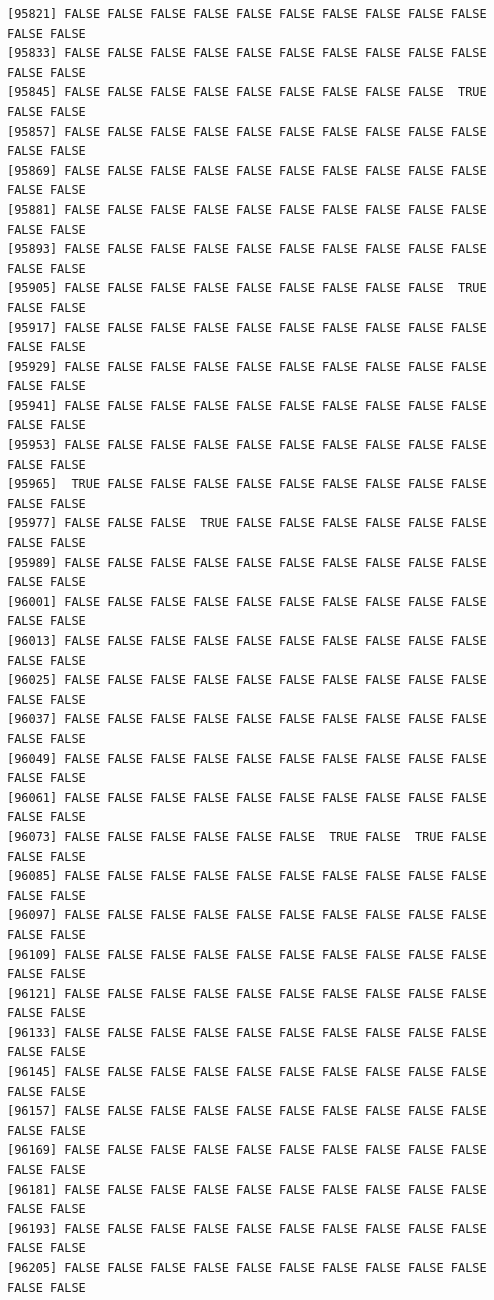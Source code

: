 \documentclass[
  a4paper,
  DIV=11,
  numbers=noendperiod]{scrartcl}
\begin{document}
\begin{verbatim}
[95821] FALSE FALSE FALSE FALSE FALSE FALSE FALSE FALSE FALSE FALSE FALSE FALSE
[95833] FALSE FALSE FALSE FALSE FALSE FALSE FALSE FALSE FALSE FALSE FALSE FALSE
[95845] FALSE FALSE FALSE FALSE FALSE FALSE FALSE FALSE FALSE  TRUE FALSE FALSE
[95857] FALSE FALSE FALSE FALSE FALSE FALSE FALSE FALSE FALSE FALSE FALSE FALSE
[95869] FALSE FALSE FALSE FALSE FALSE FALSE FALSE FALSE FALSE FALSE FALSE FALSE
[95881] FALSE FALSE FALSE FALSE FALSE FALSE FALSE FALSE FALSE FALSE FALSE FALSE
[95893] FALSE FALSE FALSE FALSE FALSE FALSE FALSE FALSE FALSE FALSE FALSE FALSE
[95905] FALSE FALSE FALSE FALSE FALSE FALSE FALSE FALSE FALSE  TRUE FALSE FALSE
[95917] FALSE FALSE FALSE FALSE FALSE FALSE FALSE FALSE FALSE FALSE FALSE FALSE
[95929] FALSE FALSE FALSE FALSE FALSE FALSE FALSE FALSE FALSE FALSE FALSE FALSE
[95941] FALSE FALSE FALSE FALSE FALSE FALSE FALSE FALSE FALSE FALSE FALSE FALSE
[95953] FALSE FALSE FALSE FALSE FALSE FALSE FALSE FALSE FALSE FALSE FALSE FALSE
[95965]  TRUE FALSE FALSE FALSE FALSE FALSE FALSE FALSE FALSE FALSE FALSE FALSE
[95977] FALSE FALSE FALSE  TRUE FALSE FALSE FALSE FALSE FALSE FALSE FALSE FALSE
[95989] FALSE FALSE FALSE FALSE FALSE FALSE FALSE FALSE FALSE FALSE FALSE FALSE
[96001] FALSE FALSE FALSE FALSE FALSE FALSE FALSE FALSE FALSE FALSE FALSE FALSE
[96013] FALSE FALSE FALSE FALSE FALSE FALSE FALSE FALSE FALSE FALSE FALSE FALSE
[96025] FALSE FALSE FALSE FALSE FALSE FALSE FALSE FALSE FALSE FALSE FALSE FALSE
[96037] FALSE FALSE FALSE FALSE FALSE FALSE FALSE FALSE FALSE FALSE FALSE FALSE
[96049] FALSE FALSE FALSE FALSE FALSE FALSE FALSE FALSE FALSE FALSE FALSE FALSE
[96061] FALSE FALSE FALSE FALSE FALSE FALSE FALSE FALSE FALSE FALSE FALSE FALSE
[96073] FALSE FALSE FALSE FALSE FALSE FALSE  TRUE FALSE  TRUE FALSE FALSE FALSE
[96085] FALSE FALSE FALSE FALSE FALSE FALSE FALSE FALSE FALSE FALSE FALSE FALSE
[96097] FALSE FALSE FALSE FALSE FALSE FALSE FALSE FALSE FALSE FALSE FALSE FALSE
[96109] FALSE FALSE FALSE FALSE FALSE FALSE FALSE FALSE FALSE FALSE FALSE FALSE
[96121] FALSE FALSE FALSE FALSE FALSE FALSE FALSE FALSE FALSE FALSE FALSE FALSE
[96133] FALSE FALSE FALSE FALSE FALSE FALSE FALSE FALSE FALSE FALSE FALSE FALSE
[96145] FALSE FALSE FALSE FALSE FALSE FALSE FALSE FALSE FALSE FALSE FALSE FALSE
[96157] FALSE FALSE FALSE FALSE FALSE FALSE FALSE FALSE FALSE FALSE FALSE FALSE
[96169] FALSE FALSE FALSE FALSE FALSE FALSE FALSE FALSE FALSE FALSE FALSE FALSE
[96181] FALSE FALSE FALSE FALSE FALSE FALSE FALSE FALSE FALSE FALSE FALSE FALSE
[96193] FALSE FALSE FALSE FALSE FALSE FALSE FALSE FALSE FALSE FALSE FALSE FALSE
[96205] FALSE FALSE FALSE FALSE FALSE FALSE FALSE FALSE FALSE FALSE FALSE FALSE

\end{verbatim}
\end{document}
